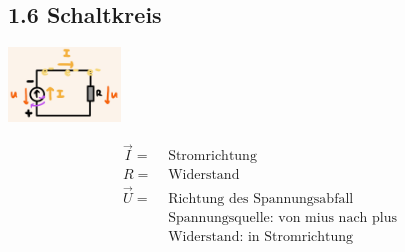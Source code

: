 \subsection*{1.6 Schaltkreis}
\vspace{-1mm}
\begin{minipage}{0.49\linewidth}
    \begin{footnotesize}
        \begin{center}
            \vspace{2mm}
            \includegraphics[width = 30mm]{src/images/schaltkreis.png}
        \end{center}
    \end{footnotesize}
\end{minipage}
\begin{minipage}{0.5\linewidth}
    \begin{scriptsize}
        \begin{center}
            \begin{align*}
                \vec{I} = &\text{ Stromrichtung}
                \\R = &\text{ Widerstand} 
                \\\vec{U} = &\text{ Richtung des Spannungsabfall}
                \\&\text{ Spannungsquelle: von mius nach plus}
                \\&\text{ Widerstand: in Stromrichtung}
            \end{align*}
        \end{center}
    \end{scriptsize}
\end{minipage}

